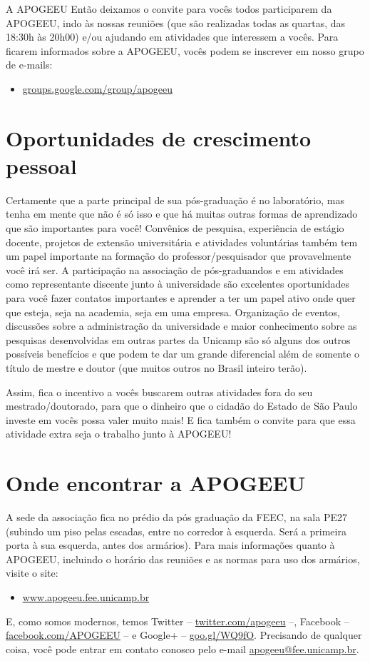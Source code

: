 \begin{story}{A APOGEEU}
Então deixamos o convite para vocês todos participarem da APOGEEU, indo às nossas reuniões (que são realizadas todas as quartas, das 18:30h às 20h00) e/ou ajudando em atividades que interessem a vocês. Para ficarem informados sobre a APOGEEU, vocês podem se inscrever em nosso grupo de e-mails:

\begin{itemize}
\item \url{groups.google.com/group/apogeeu}
\end{itemize}

\section*{Oportunidades de crescimento pessoal}

Certamente que a parte principal de sua pós-graduação é no laboratório, mas tenha em mente que não é só isso e que há muitas outras formas de aprendizado que são importantes para você! Convênios de pesquisa, experiência de estágio docente, projetos de extensão universitária e atividades voluntárias também tem um papel importante na formação do professor/pesquisador que provavelmente você irá ser. A participação na associação de pós-graduandos e em atividades como representante discente junto à universidade são excelentes oportunidades para você fazer contatos importantes e aprender a ter um papel ativo onde quer que esteja, seja na academia, seja em uma empresa. Organização de eventos, discussões sobre a administração da universidade e maior conhecimento sobre as pesquisas desenvolvidas em outras partes da Unicamp são só alguns dos outros possíveis benefícios e que podem te dar um grande diferencial além de somente o título de mestre e doutor (que muitos outros no Brasil inteiro terão).

Assim, fica o incentivo a vocês buscarem outras atividades fora do seu mestrado/doutorado, para que o dinheiro que o cidadão do Estado de São Paulo investe em vocês possa valer muito mais! E fica também o convite para que essa atividade extra seja o trabalho junto à APOGEEU!

\section*{Onde encontrar a APOGEEU}

A sede da associação fica no prédio da pós graduação da FEEC, na sala PE27 (subindo um piso pelas escadas, entre no corredor à esquerda. Será a primeira porta à sua esquerda, antes dos armários). Para mais informações quanto à APOGEEU, incluindo o horário das reuniões e as normas para uso dos armários, visite o site:

\begin{itemize}
\item \url{www.apogeeu.fee.unicamp.br}
\end{itemize}

E, como somos modernos, temos Twitter -- \url{twitter.com/apogeeu} --, Facebook -- \url{facebook.com/APOGEEU} -- e Google+ -- \url{goo.gl/WQ9fO}. Precisando de qualquer coisa, você pode entrar em contato conosco pelo e-mail \url{apogeeu@fee.unicamp.br}.

\end{story}